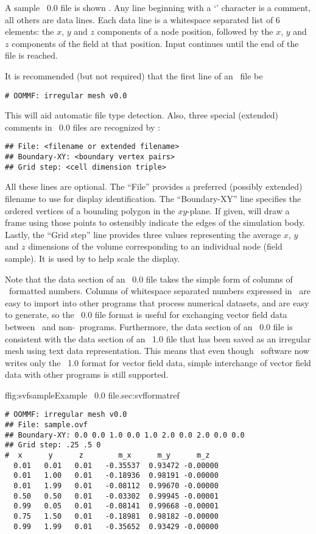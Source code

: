 A sample \OVF\ 0.0 file is shown .  Any line beginning with a `\lb' character is
a comment, all others are data lines.  Each data line is a whitespace
separated list of 6 elements: the $x$, $y$ and $z$ components of a
node position, followed by the $x$, $y$ and $z$ components of the
field at that position.  Input continues until the end of the file is
reached.

It is recommended (but not required) that the first line of an \OVF\
file be
\begin{verbatim}
# OOMMF: irregular mesh v0.0
\end{verbatim}
This will aid automatic file type detection.  Also, three special
(extended) comments in \OVF\ 0.0 files are recognized by :
\begin{verbatim}
## File: <filename or extended filename>
## Boundary-XY: <boundary vertex pairs>
## Grid step: <cell dimension triple>
\end{verbatim}
All these lines are optional.  The ``File'' provides a preferred
(possibly extended) filename to use for display identification.  The
``Boundary-XY'' line specifies the ordered vertices of a bounding
polygon in the $xy$-plane.  If given, \app{mmDisp} will draw a frame
using those points to ostensibly indicate the edges of the simulation
body.  Lastly, the ``Grid step'' line provides three values
representing the average $x$, $y$ and $z$ dimensions of the volume
corresponding to an individual node (field sample).  It is used by
\app{mmDisp} to help scale the display.

Note that the data section of an \OVF\ 0.0 file takes the simple
form of columns of \ASCII\ formatted numbers.  Columns of whitespace
separated numbers expressed in \ASCII\ are easy to import
into other programs that process numerical datasets, and
are easy to generate, so the \OVF\ 0.0 file format is useful for
exchanging vector field data between \OOMMF\ and non-\OOMMF\ programs.
Furthermore, the data section of an \OVF\ 0.0 file is consistent
with the data section of an \OVF\ 1.0 file that has been saved
as an irregular mesh using text data representation.  This means that
even though \OOMMF\ software now writes only the \OVF\ 1.0 format
for vector field data, simple interchange of vector field data
with other programs is still supported.

\begin{codelisting}{f}{fig:svfsample}{Example \OVF\ 0.0
  file.}{sec:svfformat}{ref}
\begin{verbatim}
# OOMMF: irregular mesh v0.0
## File: sample.ovf
## Boundary-XY: 0.0 0.0 1.0 0.0 1.0 2.0 0.0 2.0 0.0 0.0
## Grid step: .25 .5 0
#  x      y      z        m_x      m_y      m_z
  0.01   0.01   0.01   -0.35537  0.93472 -0.00000
  0.01   1.00   0.01   -0.18936  0.98191 -0.00000
  0.01   1.99   0.01   -0.08112  0.99670 -0.00000
  0.50   0.50   0.01   -0.03302  0.99945 -0.00001
  0.99   0.05   0.01   -0.08141  0.99668 -0.00001
  0.75   1.50   0.01   -0.18981  0.98182 -0.00000
  0.99   1.99   0.01   -0.35652  0.93429 -0.00000
\end{verbatim}
\end{codelisting}

